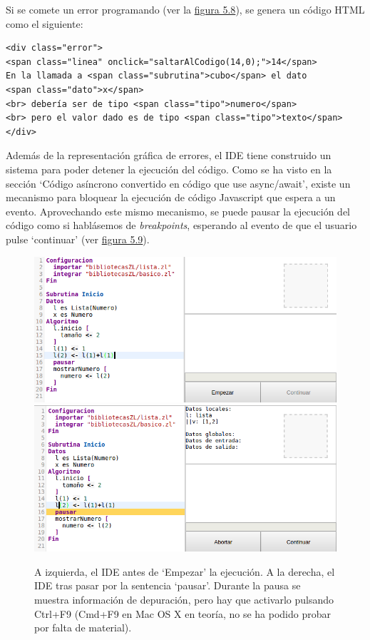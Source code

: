 \documentclass{report}
\begin{document}
	Si se comete un error programando (ver la \hyperref[fig:error]{figura 5.8}), se genera un código HTML como el siguiente:
	
	\vspace{10px}
	
	\begin{BVerbatim}
<div class="error">
<span class="linea" onclick="saltarAlCodigo(14,0);">14</span>
En la llamada a <span class="subrutina">cubo</span> el dato 
<span class="dato">x</span>
<br> debería ser de tipo <span class="tipo">numero</span>
<br> pero el valor dado es de tipo <span class="tipo">texto</span>
</div>
	\end{BVerbatim}
	
	\vspace{10px}
	
	Además de la representación gráfica de errores, el IDE tiene construido un sistema para poder detener la ejecución del código. Como se ha visto en la sección  `Código asíncrono convertido en código que use async/await', existe un mecanismo para bloquear la ejecución de código Javascript que espera a un evento. Aprovechando este mismo mecanismo, se puede pausar la ejecución del código como si hablásemos de \textit{breakpoints}\cite{breakpoint}, esperando al evento de que el usuario pulse `continuar' (ver \hyperref[fig:pausa1]{figura 5.9}).
	
	
	
\begin{figure}
\centering
\includegraphics[width=0.45\linewidth]{pausa1}
\includegraphics[width=0.45\linewidth]{pausa2}
\caption[Ejemplo de uso de pausa (breakpoint).]{A izquierda, el IDE antes de `Empezar' la ejecución. A la derecha, el IDE tras pasar por la sentencia `pausar'. Durante la pausa se muestra información de depuración, pero hay que activarlo pulsando Ctrl+F9 (Cmd+F9 en Mac OS X en teoría, no se ha podido probar por falta de material).}
\label{fig:pausa1}
\end{figure}
	
\end{document}
